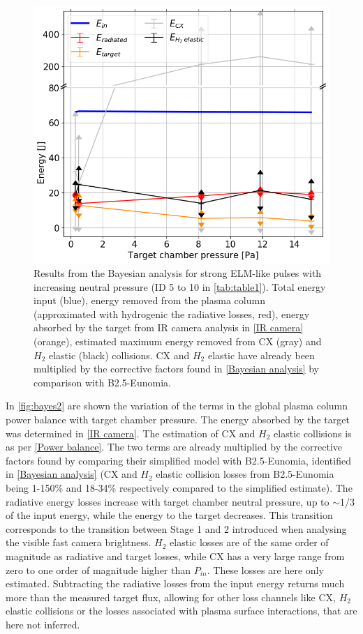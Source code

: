 \begin{figure}[!ht]
        \centering
    	\includegraphics[width=0.7\linewidth,trim={0 0 0 5},clip]{Chapters/chapter3/figs/bayesian_strong_3b.png}
	\caption{Results from the Bayesian analysis for strong ELM-like pulses with increasing neutral pressure (ID 5 to 10 in \autoref{tab:table1}). Total energy input (blue), energy removed from the plasma column (approximated with hydrogenic the radiative losses, red), energy absorbed by the target from IR camera analysis in \autoref{IR camera} (orange), estimated maximum energy removed from CX (gray) and $H_2$ elastic (black) collisions. CX and $H_2$ elastic have already been multiplied by the corrective factors found in \autoref{Bayesian analysis} by comparison with B2.5-Eunomia.}
	\label{fig:bayes2}
\end{figure}

In \autoref{fig:bayes2} are shown the variation of the terms in the global plasma column power balance with target chamber pressure. The energy absorbed by the target was determined in \autoref{IR camera}. The estimation of CX and $H_2$ elastic collisions is as per \autoref{Power balance}. The two terms are already multiplied by the corrective factors found by comparing their simplified model with B2.5-Eunomia, identified in \autoref{Bayesian analysis} (CX and $H_2$ elastic collision losses from B2.5-Eunomia being 1-150\% and 18-34\% respectively compared to the simplified estimate). The radiative energy losses increase with target chamber neutral pressure, up to $\sim$1/3 of the input energy, while the energy to the target decreases. This transition corresponds to the transition between Stage 1 and 2 introduced when analysing the visible fast camera brightness. $H_2$ elastic losses are of the same order of magnitude as radiative and target losses, while CX has a very large range from zero to one order of magnitude higher than $P_{in}$. These losses are here only estimated. Subtracting the radiative losses from the input energy returns much more than the measured target flux, allowing for other loss channels like CX, $H_2$ elastic collisions or the losses associated with plasma surface interactions, that are here not inferred.

